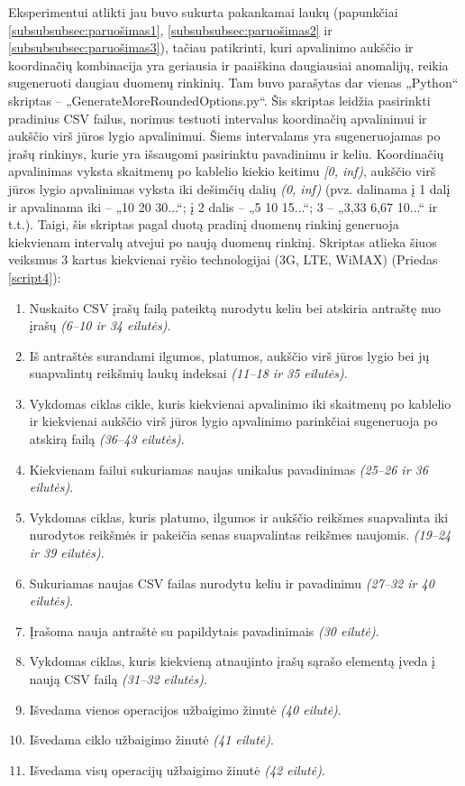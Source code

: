 \documentclass{VUMIFPSbakalaurinis}
\begin{document}
 \label{subsubsubsec:paruošimas4}
Eksperimentui atlikti jau buvo sukurta pakankamai laukų (papunkčiai \ref{subsubsubsec:paruošimas1}, \ref{subsubsubsec:paruošimas2} ir \ref{subsubsubsec:paruošimas3}), tačiau patikrinti, kuri apvalinimo aukščio ir koordinačių kombinacija yra geriausia ir paaiškina daugiausiai anomalijų, reikia sugeneruoti daugiau duomenų rinkinių. Tam buvo parašytas dar vienas „Python“ skriptas – „GenerateMoreRoundedOptions.py“. Šis skriptas leidžia pasirinkti pradinius CSV failus, norimus testuoti intervalus koordinačių apvalinimui ir aukščio virš jūros lygio apvalinimui. Šiems intervalams yra sugeneruojamas po įrašų rinkinys, kurie yra išsaugomi pasirinktu pavadinimu ir keliu. Koordinačių apvalinimas vyksta skaitmenų po kablelio kiekio keitimu \textit{[0, inf)}, aukščio virš jūros lygio apvalinimas vyksta iki dešimčių dalių \textit{(0, inf)} (pvz. dalinama į 1 dalį ir apvalinama iki – „10 20 30...“; į 2 dalis – „5 10 15...“; 3 – „3,33 6,67 10...“ ir t.t.). Taigi, šis skriptas pagal duotą pradinį duomenų rinkinį generuoja kiekvienam intervalų atvejui po naują duomenų rinkinį. Skriptas atlieka šiuos veiksmus 3 kartus kiekvienai ryšio technologijai (3G, LTE, WiMAX) (Priedas \ref{script4}):
\begin{enumerate}
	\item Nuskaito CSV įrašų failą pateiktą nurodytu keliu bei atskiria antraštę nuo įrašų \textit{(6–10 ir 34 eilutės)}. 
	\item Iš antraštės surandami ilgumos, platumos, aukščio virš jūros lygio bei jų suapvalintų reikšmių laukų indeksai \textit{(11–18 ir 35 eilutės)}.
	\item Vykdomas ciklas cikle, kuris kiekvienai apvalinimo iki skaitmenų po kablelio ir kiekvienai aukščio virš jūros lygio apvalinimo parinkčiai sugeneruoja po atskirą failą \textit{(36–43 eilutės)}.
	\item Kiekvienam failui sukuriamas naujas unikalus pavadinimas \textit{(25–26 ir 36 eilutės)}.
	\item Vykdomas ciklas, kuris platumo, ilgumos ir aukščio reikšmes suapvalinta iki nurodytos reikšmės ir pakeičia senas suapvalintas reikšmes naujomis. \textit{(19–24 ir 39 eilutės)}.
	\item Sukuriamas naujas CSV failas nurodytu keliu ir pavadinimu \textit{(27–32 ir 40 eilutės)}.
	\item Įrašoma nauja antraštė su papildytais pavadinimais \textit{(30 eilutė)}.
	\item Vykdomas ciklas, kuris kiekvieną atnaujinto įrašų sąrašo elementą įveda į naują CSV failą \textit{(31–32 eilutės)}.
	\item Išvedama vienos operacijos užbaigimo žinutė \textit{(40 eilutė)}.
	\item Išvedama ciklo užbaigimo žinutė \textit{(41 eilutė)}.
	\item Išvedama visų operacijų užbaigimo žinutė \textit{(42 eilutė)}.
\end{enumerate}
 
\end{document}
